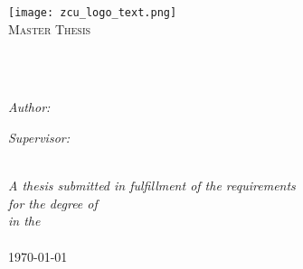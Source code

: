 \frontmatter %

\pagestyle{plain} %


\begin{titlepage}
\begin{center}
\texttt{[image: zcu\_logo\_text.png]} %
\\\vspace{3cm}
\textsc{\Large Master Thesis}\\[0.2cm] 	 %

\HRule \\[0.4cm] %
{\huge \bfseries \ttitle\par}\vspace{0.4cm} %
\HRule \\[1.5cm] %
 
\begin{minipage}[t]{0.45\textwidth}
\begin{flushleft} \large
\emph{Author:}\\
\href{http://www.kitt.evee.cz}{\authorname}
\end{flushleft}
\end{minipage}
\begin{minipage}[t]{0.45\textwidth}
\begin{flushright} \large
\emph{Supervisor:} \\
\href{http://www.kky.zcu.cz/cs/people/smidl-lubos}{\supname}
\end{flushright}
\end{minipage}\\[2.5cm]
 
\large \textit{A thesis submitted in fulfillment of the requirements\\ for the degree of \degreename}\\[0.3cm] %
\textit{in the}\\[0.4cm]
\deptname %
 \\\vspace{2cm}
{\large \today} %
 
\vfill
\end{center}
\end{titlepage}